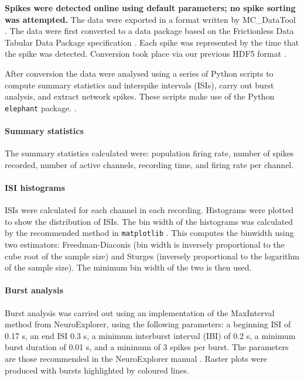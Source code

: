\documentclass[doublespacing]{bmcart}
\begin{document}
\par \textbf{Spikes were detected online using default parameters; no
  spike sorting was attempted.}  The data were exported in a format written by MC\_DataTool \cite{Systems2014-tw}. The data were first converted to a data package based on the Frictionless Data Tabular Data Package specification \cite{Walsh2017-nm}. Each spike was represented by the time that the spike was detected. Conversion took place via our previous HDF5 format \cite{Eglen2014}.

\par After conversion the data were analysed using a series of Python
scripts to compute summary statistics and interspike intervals (ISIs),
carry out burst analysis, and extract network spikes. These scripts
make use of the Python \texttt{elephant} package.
\cite{elephant_toolkit}.

\paragraph{Summary statistics} The summary statistics calculated were: population firing rate, number of spikes recorded, number of active channels, recording time, and firing rate per channel.

\paragraph{ISI histograms} ISIs were calculated for each channel in each recording. Histograms were plotted to show the distribution of ISIs. The bin width of the histograms was calculated by the recommended method in \texttt{matplotlib} \cite{Community2020-xp}. This computes the binwidth using two estimators: Freedman-Diaconis (bin width is inversely proportional to the cube root of the sample size) and Sturges (inversely proportional to the logarithm of the sample size). The minimum bin width of the two is then used.

\paragraph{Burst analysis} Burst analysis was carried out using an implementation of the MaxInterval method from NeuroExplorer, using the following parameters: a beginning ISI of 0.17 s, an end ISI 0.3 s, a minimum interburst interval (IBI) of 0.2 s, a minimum burst duration of 0.01 s, and a minimum of 3 spikes per burst. The parameters are those recommended in the NeuroExplorer manual \cite{neuroexplorer2020}. Raster plots were produced with bursts highlighted by coloured lines.
\end{document}
